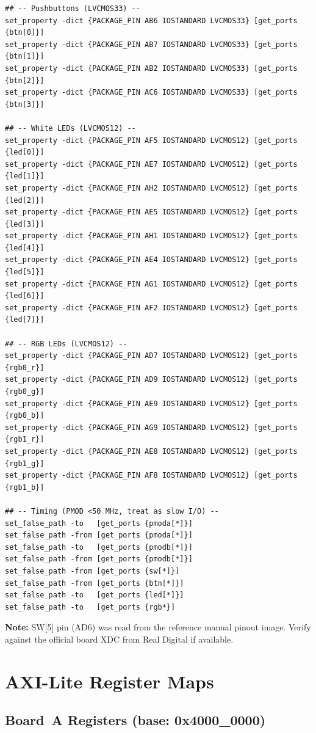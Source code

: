 \documentclass[conference]{IEEEtran}
\begin{document}
\begin{lstlisting}
## -- Pushbuttons (LVCMOS33) --
set_property -dict {PACKAGE_PIN AB6 IOSTANDARD LVCMOS33} [get_ports {btn[0]}]
set_property -dict {PACKAGE_PIN AB7 IOSTANDARD LVCMOS33} [get_ports {btn[1]}]
set_property -dict {PACKAGE_PIN AB2 IOSTANDARD LVCMOS33} [get_ports {btn[2]}]
set_property -dict {PACKAGE_PIN AC6 IOSTANDARD LVCMOS33} [get_ports {btn[3]}]

## -- White LEDs (LVCMOS12) --
set_property -dict {PACKAGE_PIN AF5 IOSTANDARD LVCMOS12} [get_ports {led[0]}]
set_property -dict {PACKAGE_PIN AE7 IOSTANDARD LVCMOS12} [get_ports {led[1]}]
set_property -dict {PACKAGE_PIN AH2 IOSTANDARD LVCMOS12} [get_ports {led[2]}]
set_property -dict {PACKAGE_PIN AE5 IOSTANDARD LVCMOS12} [get_ports {led[3]}]
set_property -dict {PACKAGE_PIN AH1 IOSTANDARD LVCMOS12} [get_ports {led[4]}]
set_property -dict {PACKAGE_PIN AE4 IOSTANDARD LVCMOS12} [get_ports {led[5]}]
set_property -dict {PACKAGE_PIN AG1 IOSTANDARD LVCMOS12} [get_ports {led[6]}]
set_property -dict {PACKAGE_PIN AF2 IOSTANDARD LVCMOS12} [get_ports {led[7]}]

## -- RGB LEDs (LVCMOS12) --
set_property -dict {PACKAGE_PIN AD7 IOSTANDARD LVCMOS12} [get_ports {rgb0_r}]
set_property -dict {PACKAGE_PIN AD9 IOSTANDARD LVCMOS12} [get_ports {rgb0_g}]
set_property -dict {PACKAGE_PIN AE9 IOSTANDARD LVCMOS12} [get_ports {rgb0_b}]
set_property -dict {PACKAGE_PIN AG9 IOSTANDARD LVCMOS12} [get_ports {rgb1_r}]
set_property -dict {PACKAGE_PIN AE8 IOSTANDARD LVCMOS12} [get_ports {rgb1_g}]
set_property -dict {PACKAGE_PIN AF8 IOSTANDARD LVCMOS12} [get_ports {rgb1_b}]

## -- Timing (PMOD <50 MHz, treat as slow I/O) --
set_false_path -to   [get_ports {pmoda[*]}]
set_false_path -from [get_ports {pmoda[*]}]
set_false_path -to   [get_ports {pmodb[*]}]
set_false_path -from [get_ports {pmodb[*]}]
set_false_path -from [get_ports {sw[*]}]
set_false_path -from [get_ports {btn[*]}]
set_false_path -to   [get_ports {led[*]}]
set_false_path -to   [get_ports {rgb*}]
\end{lstlisting}

\textbf{Note:} SW[5] pin (AD6) was read from the reference manual pinout image. Verify against the official board XDC from Real Digital if available.

\section{AXI-Lite Register Maps}
\label{app:regmaps}

\subsection{Board~A Registers (base: 0x4000\_0000)}
\end{document}
